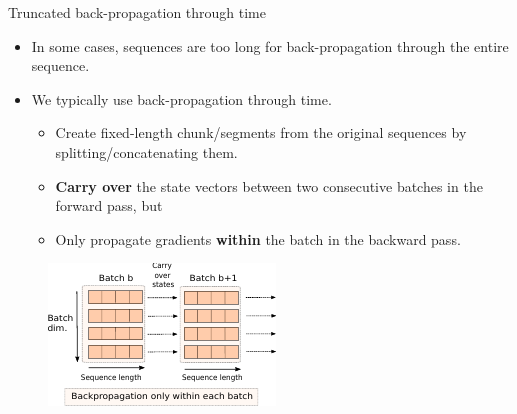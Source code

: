 \begin{frame}{Truncated back-propagation through time}

\begin{itemize}
\item In some cases, sequences are too long for back-propagation through the entire sequence.
\item We typically use  back-propagation through time.
\begin{itemize}
\item Create fixed-length chunk/segments from the original sequences
by splitting/concatenating them.
\item \textbf{Carry over} the state vectors between two consecutive batches in the forward pass, but
\item Only propagate gradients \textbf{within} the batch in the backward pass.
\end{itemize}
\end{itemize}
\begin{figure}
                        \centering
                        \includegraphics[width=.5\linewidth]{./figures/truncated_bptt.pdf}
\end{figure}


\end{frame}


